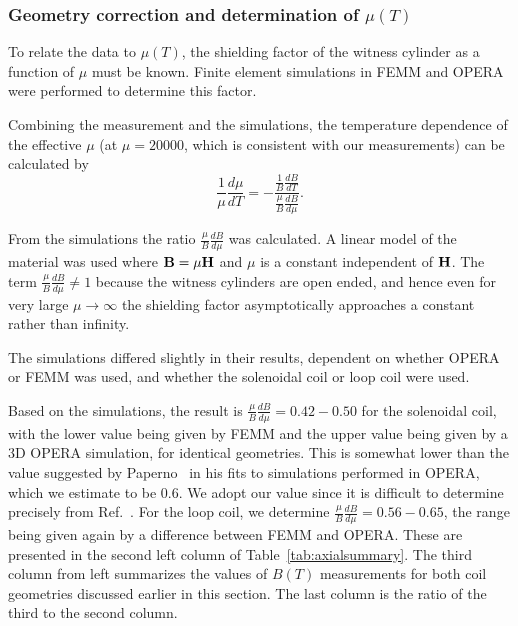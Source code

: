 




\subsubsection{Geometry correction and determination of $\mu(T)$\label{sec:axialsims}}

To relate the data to $\mu(T)$, the shielding factor of the witness
cylinder as a function of $\mu$ must be known.  Finite element
simulations in FEMM and OPERA were performed to determine this factor.

Combining the measurement and the simulations, the temperature
dependence of the effective $\mu$ (at $\mu=20 000$, which is consistent
with our measurements) can be calculated by
\begin{equation}
\frac{1}{\mu}\frac{d\mu}{dT}=-\frac{\frac{1}{B}\frac{dB}{dT}}{\frac{\mu}{B}\frac{dB}{d\mu}}.
\end{equation}

From the simulations the ratio $\frac{\mu}{B} \frac{dB}{d\mu}$ was
calculated.  A linear model of the material was used where
$\bold{B}=\mu \bold{H}$ and $\mu$ is a constant independent of
$\bold{H}$.  The term $\frac{\mu}{B}\frac{dB}{d\mu}\neq 1$ because the
witness cylinders are open ended, and hence even for very large
$\mu\rightarrow\infty$ the shielding factor asymptotically approaches
a constant rather than infinity.

The simulations differed slightly in their results, dependent on
whether OPERA or FEMM was used, and whether the solenoidal coil or
loop coil were used.

Based on the simulations, the result is
$\frac{\mu}{B}\frac{dB}{d\mu}=0.42-0.50$ for the solenoidal coil, with
the lower value being given by FEMM and the upper value being given by
a 3D OPERA simulation, for identical geometries.  This is somewhat
lower than the value suggested by
Paperno~\cite{bib:paperno-open-ended} in his fits to simulations
performed in OPERA, which we estimate to be 0.6.  We adopt our value
since it is difficult to determine precisely from
Ref.~\cite{bib:paperno-open-ended}.  For the loop coil, we determine
$\frac{\mu}{B}\frac{dB}{d\mu}=0.56-0.65$, the range being given again
by a difference between FEMM and OPERA. These are presented in the second left column of Table~\ref{tab:axialsummary}. The third column from left summarizes the values of $B(T)$ measurements for both coil geometries discussed earlier in this section. The last column is the ratio of the third to the second column. 



